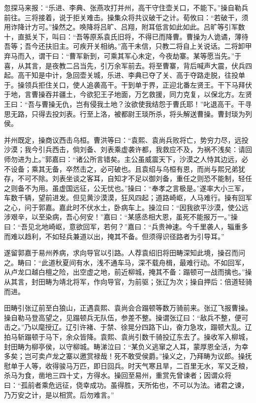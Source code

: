 忽探马来报：“乐进、李典、张燕攻打并州，高干守住壶关口，不能下。”操自勒兵前往。三将接着，说于拒关难击。操集众将共议破干之计。荀攸曰：“若破干，须用诈降计方可。”操然之。唤降将吕旷、吕翔，附耳低言如此如此。吕旷等引军数十，直抵关下，叫曰：“吾等原系袁氏旧将，不得已而降曹。曹操为人诡谲，薄待吾等；吾今还扶旧主。可疾开关相纳。”高干未信，只教二将自上关说话。二将卸甲弃马而入，谓干曰：“曹军新到，可乘其军心未定，今夜劫寨。某等愿当先。”于喜，从其言，是夜教二吕当先，引万余军前去。将至曹寨，背后喊声大震，伏兵四起。高干知是中计，急回壶关城，乐进、李典已夺了关、高于夺路走脱，往投单于。操领兵拒住关口，使人追袭高干。干到单于界，正迎北番左贤王。干下马拜伏于地，言曹操吞并疆土，今欲犯王子地面，万乞救援，同力克复，以保北方。左贤王曰：“吾与曹操无仇，岂有侵我土地？汝欲使我结怨于曹氏耶！”叱退高干。干寻思无路，只得去投刘表。行至上洛，被都尉王琰所杀，将头解送曹操。曹封琰为列侯。

并州既定，操商议西击乌桓。曹洪等曰：“袁熙、袁尚兵败将亡，势穷力尽，远投沙漠；我今引兵西击，倘刘备、刘表乘虚袭许都，我救应不及，为祸不浅矣：请回师勿进为上。”郭嘉曰：“诸公所言错矣。主公虽威震天下，沙漠之人恃其边远，必不设备；乘其无备，卒然击之，必可破也。且袁绍与乌桓有恩，而尚与熙兄弟犹存，不可不除。刘表坐谈之客耳，自知才不足以御刘备，重任之则恐不能制，轻任之则备不为用。虽虚国远征，公无忧也。”操曰：“奉孝之言极是。”遂率大小三军，车数千辆，望前进发。但见黄沙漠漠，狂风四起；道路崎岖，人马难行。操有回军之心，问于郭嘉。嘉此时不伏水土，卧病车上。操泣曰：“因我欲平沙漠，使公远涉艰辛，以至染病，吾心何安！”嘉曰：“某感丞相大恩，虽死不能报万一。”操曰：“吾见北地崎岖，意欲回军，若何？”嘉曰：“兵贵神速。今千里袭人，辎重多而难以趋利，不如轻兵兼道以出，掩其不备。但须得识径路者为引导耳。”

遂留郭嘉于易州养病，求向导官以引路。人荐袁绍旧将田畴深知此境，操召而问之。畴曰：“此道秋夏间有水，浅不通车马，深不载舟楫，最难行动。不如回军，从卢龙口越白檀之险，出空虚之地，前近柳城，掩其不备：蹋顿可一战而擒也。”操从其言，封田畴为靖北将军，作向导官，为前驱；张辽为次；操自押后：倍道轻骑而进。

田畴引张辽前至白狼山，正遇袁熙、袁尚会合蹋顿等数万骑前来。张辽飞报曹操。操自勒马登高望之，见蹋顿兵无队伍，参差不整。操谓张辽曰：“敌兵不整，便可击之。”乃以麾授辽。辽引许褚、于禁、徐晃分四路下山，奋力急攻，蹋顿大乱。辽拍马斩蹋顿于马下，余众皆降。袁熙、袁尚引数千骑投辽东去了。操收军入柳城，封田畴为柳亭侯，以守柳城。畴涕泣曰：“某负义逃窜之人耳，蒙厚恩全活，为幸多矣；岂可卖卢龙之寨以邀赏禄哉！死不敢受侯爵。”操义之，乃拜畴为议郎。操抚慰单于人等，收得骏马万匹，即日回兵。时天气寒且旱，二百里无水，军又乏粮，杀马为食，凿地三四十丈，方得水。操回至易州，重赏先曾谏者；因谓众将曰：“孤前者乘危远征，侥幸成功。虽得胜，天所佑也，不可以为法。诸君之谏，乃万安之计，是以相赏。后勿难言。”


